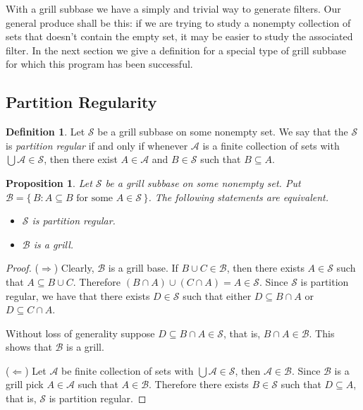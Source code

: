 \documentclass[12pt]{article}
\theoremstyle{plain}
\newtheorem{prop}[thm]{Proposition}
\theoremstyle{definition}
\newtheorem{defn}[thm]{Definition}
\newcommand{\calA}{\mathcal{A}}
\newcommand{\calB}{\mathcal{B}}
\newcommand{\calS}{\mathcal{S}}
\begin{document}
With a grill subbase we have a simply and trivial way to generate filters.
Our general produce shall be this: if we are trying to study a nonempty collection of sets that doesn't contain the empty set, it may be easier to study the associated filter.
In the next section we give a definition for a special type of grill subbase for which this program has been successful.

\subsection{Partition Regularity}
\begin{defn}
  Let $\calS$ be a grill subbase on some nonempty set.
  We say that the $\calS$ is \textsl{partition regular} if and only if whenever $\calA$ is a finite collection of sets with $\bigcup\calA \in \calS$, then there exist $A \in \calA$ and $B \in \calS$ such that $B \subseteq A$.
\end{defn}

\begin{prop}
  Let $\calS$ be a grill subbase on some nonempty set.
  Put $\calB = \{\, B : \mbox{$A \subseteq B$ for some $A \in \calS$} \,\}$. 
  The following statements are equivalent.
  \begin{itemize}
    \item[(a)] $\calS$ is partition regular.
    \item[(b)] $\calB$ is a grill.
  \end{itemize}
\end{prop}
\begin{proof}
  ($\Rightarrow$)
  Clearly, $\calB$ is a grill base. 
  If $B \cup C \in \calB$, then there exists $A \in \calS$ such that $A \subseteq B \cup C$. 
  Therefore $(B \cap A) \cup (C \cap A) = A \in \calS$. 
  Since $\calS$ is partition regular, we have that there exists $D \in \calS$ such that either $D \subseteq B \cap A$ or $D \subseteq C \cap A$.
  
  Without loss of generality suppose $D \subseteq B \cap A \in \calS$, that is, $B \cap A \in \calB$.
  This shows that $\calB$ is a grill.

  ($\Leftarrow$)
  Let $\calA$ be finite collection of sets with $\bigcup\calA \in \calS$, then $\calA \in \calB$.
  Since $\calB$ is a grill pick $A \in \calA$ such that $A \in \calB$.
  Therefore there exists $B \in \calS$ such that $D \subseteq A$, that is, $\calS$ is partition regular.
\end{proof}
\end{document}
